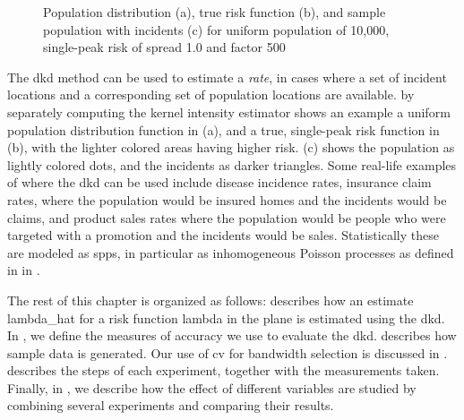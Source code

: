 \begin{figure}[htbp]
    
    \caption[]{Population distribution (a), true risk function (b), and sample population with incidents (c) for uniform population of 10,000, single-peak risk of \gls{spread} 1.0 and \gls{factor} 500}
    \label{fig:method:distributions:unif_500_1.0_1h}    
\end{figure}
\setpath{}
The \gls{dkd} method can be used to estimate a \textit{rate},
in cases where a set of incident locations and a corresponding set of population locations are available.
by separately computing the \gls{kernel intensity estimator}
 shows an example a uniform population distribution function in (a),
and a true, single-peak risk function in (b),
with the lighter colored areas having higher risk.
(c) shows the population as lightly colored dots,
and the incidents as darker triangles.
Some real-life examples of where the \gls{dkd} can be used include disease incidence rates,
insurance claim rates,
where the population would be insured homes and the incidents would be claims,
and product sales rates where the population would be people who were targeted with a promotion and the incidents would be sales.
Statistically these are modeled as \glspl{spp},
in particular as inhomogeneous Poisson processes
as defined in  in .

The rest of this chapter is organized as follows:
 describes how an estimate \gls{lambda_hat} for a risk function \gls{lambda} in the plane is estimated using the \gls{dkd}.
In , we define the measures of accuracy we use to evaluate the \gls{dkd}.
 describes how sample data is generated.
Our use of \gls{cv} for bandwidth selection is discussed in  .
 describes the steps of each experiment, together with the measurements taken.
Finally, in , we describe how the effect of different variables are studied by combining several experiments and comparing their results.

%
%
